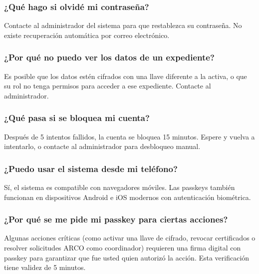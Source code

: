 \documentclass[11pt,twoside]{article}
\begin{document}
\subsubsection*{¿Qué hago si olvidé mi contraseña?}
Contacte al administrador del sistema para que restablezca su contraseña. No existe
recuperación automática por correo electrónico.

\subsubsection*{¿Por qué no puedo ver los datos de un expediente?}
Es posible que los datos estén cifrados con una llave diferente a la activa, o que su rol no tenga permisos para acceder a ese expediente. Contacte al administrador.

\subsubsection*{¿Qué pasa si se bloquea mi cuenta?}
Después de 5 intentos fallidos, la cuenta se bloquea 15 minutos. Espere y vuelva a
intentarlo, o contacte al administrador para desbloqueo manual.

\subsubsection*{¿Puedo usar el sistema desde mi teléfono?}
Sí, el sistema es compatible con navegadores móviles. Las passkeys también funcionan
en dispositivos Android e iOS modernos con autenticación biométrica.

\subsubsection*{¿Por qué se me pide mi passkey para ciertas acciones?}
Algunas acciones críticas (como activar una llave de cifrado, revocar certificados o
resolver solicitudes ARCO como coordinador) requieren una firma digital con passkey
para garantizar que fue usted quien autorizó la acción. Esta verificación tiene
validez de 5 minutos.
\end{document}
